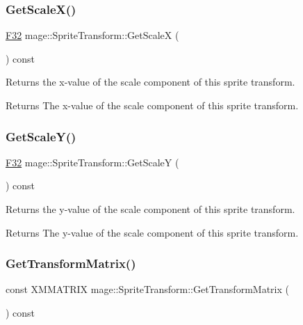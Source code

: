 \subsubsection{\texorpdfstring{Get\+Scale\+X()}{GetScaleX()}}
{\footnotesize\ttfamily \hyperlink{namespacemage_aa97e833b45f06d60a0a9c4fc22ae02c0}{F32} mage\+::\+Sprite\+Transform\+::\+Get\+ScaleX (\begin{DoxyParamCaption}{ }\end{DoxyParamCaption}) const\hspace{0.3cm}{\ttfamily [noexcept]}}

Returns the x-\/value of the scale component of this sprite transform.

\begin{DoxyReturn}{Returns}
The x-\/value of the scale component of this sprite transform. 
\end{DoxyReturn}
\hypertarget{classmage_1_1_sprite_transform_a07010f5d7e781ca641456b18fd16e67f}{}\label{classmage_1_1_sprite_transform_a07010f5d7e781ca641456b18fd16e67f} 
\subsubsection{\texorpdfstring{Get\+Scale\+Y()}{GetScaleY()}}
{\footnotesize\ttfamily \hyperlink{namespacemage_aa97e833b45f06d60a0a9c4fc22ae02c0}{F32} mage\+::\+Sprite\+Transform\+::\+Get\+ScaleY (\begin{DoxyParamCaption}{ }\end{DoxyParamCaption}) const\hspace{0.3cm}{\ttfamily [noexcept]}}

Returns the y-\/value of the scale component of this sprite transform.

\begin{DoxyReturn}{Returns}
The y-\/value of the scale component of this sprite transform. 
\end{DoxyReturn}
\hypertarget{classmage_1_1_sprite_transform_a4e5d58a02d951c021e3e41e4ac183d0d}{}\label{classmage_1_1_sprite_transform_a4e5d58a02d951c021e3e41e4ac183d0d} 
\subsubsection{\texorpdfstring{Get\+Transform\+Matrix()}{GetTransformMatrix()}}
{\footnotesize\ttfamily const X\+M\+M\+A\+T\+R\+IX mage\+::\+Sprite\+Transform\+::\+Get\+Transform\+Matrix (\begin{DoxyParamCaption}{ }\end{DoxyParamCaption}) const\hspace{0.3cm}{\ttfamily [noexcept]}}

